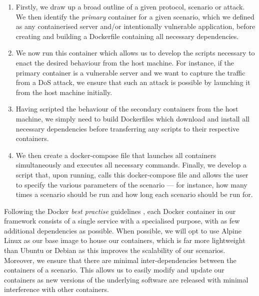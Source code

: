 \documentclass[msc,deptreport, cs]{infthesis} %
\begin{document}
\begin{enumerate}

  \item Firstly, we draw up a broad outline of a given protocol, scenario or attack. We then identify the \textit{primary} container for a given scenario, which we defined as any containerised server and/or intentionally vulnerable application, before creating and building a Dockerfile containing all necessary dependencies. 
  
  \item We now run this container which allows us to develop the scripts necessary to enact the desired behaviour from the host machine. For instance, if the primary container is a vulnerable server and we want to capture the traffic from a DoS attack, we ensure that such an attack is possible by launching it from the host machine initially. 
  
  \item Having scripted the behaviour of the secondary containers from the host machine, we simply need to build Dockerfiles which download and install all necessary dependencies before transferring any scripts to their respective containers.

  \item We then create a docker-compose file that launches all containers simultaneously and executes all necessary commands. Finally, we develop a script that, upon running, calls this docker-compose file and allows the user to specify the various parameters of the scenario --- for instance, how many times a scenario should be run and how long each scenario should be run for.

\end{enumerate}

Following the Docker \textit{best practise} guidelines \cite{bestpractise}, each Docker container in our framework consists of a single service with a specialised purpose, with as few additional dependencies as possible. When possible, we will opt to use Alpine Linux as our base image to house our containers, which is far more lightweight than Ubuntu or Debian as this improves the scalability of our scenarios. Moreover, we ensure that there are minimal inter-dependencies between the containers of a scenario. This allows us to easily modify and update our containers as new versions of the underlying software are released with minimal interference with other containers.

  
\end{document}
